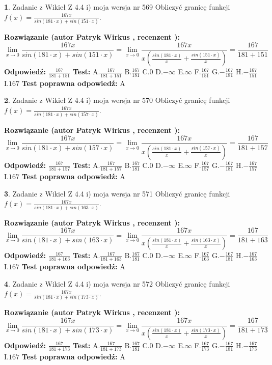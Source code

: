 \documentclass[12pt, a4paper]{article}
\theoremstyle{definition} %
\newtheorem{zad}{}
\newcommand{\zadStart}[1]{\begin{zad}#1\newline}
\newcommand{\zadStop}{\end{zad}}
\newcommand{\rozwStart}[2]{\noindent \textbf{Rozwiązanie (autor #1 , recenzent #2): }\newline}
\newcommand{\rozwStop}{\newline}
\newcommand{\odpStart}{\noindent \textbf{Odpowiedź:}\newline}
\newcommand{\odpStop}{\newline}
\newcommand{\testStart}{\noindent \textbf{Test:}\newline}
\newcommand{\testStop}{\newline}
\newcommand{\kluczStart}{\noindent \textbf{Test poprawna odpowiedź:}\newline}
\newcommand{\kluczStop}{\newline}
\begin{document}
\zadStart{Zadanie z Wikieł Z 4.4 i) moja wersja nr 569}
Obliczyć granicę funkcji $f(x)=\frac{167x}{sin(181\cdot x) +sin(151\cdot x)}$.
\zadStop
\rozwStart{Patryk Wirkus}{}
$$\lim\limits_{x\to 0}\frac{167x}{sin(181\cdot x) +sin(151\cdot x)}=\lim\limits_{x\to 0}\frac{167x}{x(\frac{sin(181\cdot x)}{x}+\frac{sin(151\cdot x)}{x})}=\frac{167}{181+151}$$
\rozwStop
\odpStart
$\frac{167}{181+151}$
\odpStop
\testStart
A.$\frac{167}{181+151}$
B.$\frac{167}{181}$
C.$0$
D.$-\infty$
E.$\infty$
F.$\frac{167}{151}$
G.$-\frac{167}{181}$
H.$-\frac{167}{151}$
I.$167$
\testStop
\kluczStart
A
\kluczStop



\zadStart{Zadanie z Wikieł Z 4.4 i) moja wersja nr 570}
Obliczyć granicę funkcji $f(x)=\frac{167x}{sin(181\cdot x) +sin(157\cdot x)}$.
\zadStop
\rozwStart{Patryk Wirkus}{}
$$\lim\limits_{x\to 0}\frac{167x}{sin(181\cdot x) +sin(157\cdot x)}=\lim\limits_{x\to 0}\frac{167x}{x(\frac{sin(181\cdot x)}{x}+\frac{sin(157\cdot x)}{x})}=\frac{167}{181+157}$$
\rozwStop
\odpStart
$\frac{167}{181+157}$
\odpStop
\testStart
A.$\frac{167}{181+157}$
B.$\frac{167}{181}$
C.$0$
D.$-\infty$
E.$\infty$
F.$\frac{167}{157}$
G.$-\frac{167}{181}$
H.$-\frac{167}{157}$
I.$167$
\testStop
\kluczStart
A
\kluczStop



\zadStart{Zadanie z Wikieł Z 4.4 i) moja wersja nr 571}
Obliczyć granicę funkcji $f(x)=\frac{167x}{sin(181\cdot x) +sin(163\cdot x)}$.
\zadStop
\rozwStart{Patryk Wirkus}{}
$$\lim\limits_{x\to 0}\frac{167x}{sin(181\cdot x) +sin(163\cdot x)}=\lim\limits_{x\to 0}\frac{167x}{x(\frac{sin(181\cdot x)}{x}+\frac{sin(163\cdot x)}{x})}=\frac{167}{181+163}$$
\rozwStop
\odpStart
$\frac{167}{181+163}$
\odpStop
\testStart
A.$\frac{167}{181+163}$
B.$\frac{167}{181}$
C.$0$
D.$-\infty$
E.$\infty$
F.$\frac{167}{163}$
G.$-\frac{167}{181}$
H.$-\frac{167}{163}$
I.$167$
\testStop
\kluczStart
A
\kluczStop



\zadStart{Zadanie z Wikieł Z 4.4 i) moja wersja nr 572}
Obliczyć granicę funkcji $f(x)=\frac{167x}{sin(181\cdot x) +sin(173\cdot x)}$.
\zadStop
\rozwStart{Patryk Wirkus}{}
$$\lim\limits_{x\to 0}\frac{167x}{sin(181\cdot x) +sin(173\cdot x)}=\lim\limits_{x\to 0}\frac{167x}{x(\frac{sin(181\cdot x)}{x}+\frac{sin(173\cdot x)}{x})}=\frac{167}{181+173}$$
\rozwStop
\odpStart
$\frac{167}{181+173}$
\odpStop
\testStart
A.$\frac{167}{181+173}$
B.$\frac{167}{181}$
C.$0$
D.$-\infty$
E.$\infty$
F.$\frac{167}{173}$
G.$-\frac{167}{181}$
H.$-\frac{167}{173}$
I.$167$
\testStop
\kluczStart
A
\kluczStop
\end{document}
